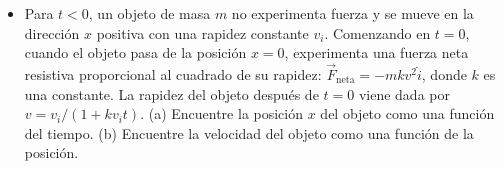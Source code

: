\documentclass[11pt,a4paper]{article}
\begin{document}
\begin{itemize}
    \item[\textbf{29.}] Para $t < 0$, un objeto de masa $m$ no experimenta fuerza y se mueve en la dirección $x$ positiva con una rapidez constante $v_i$. Comenzando en $t = 0$, cuando el objeto pasa de la posición $x = 0$, experimenta una fuerza neta resistiva proporcional al cuadrado de su rapidez: $\vec{F}_{\text{neta}} = -mkv^2 \hat{i}$, donde $k$ es una constante. La rapidez del objeto después de $t = 0$ viene dada por $v = v_i / (1 + kv_it)$. (a) Encuentre la posición $x$ del objeto como una función del tiempo. (b) Encuentre la velocidad del objeto como una función de la posición.
    \vspace*{7cm}
\end{itemize}
\end{document}
